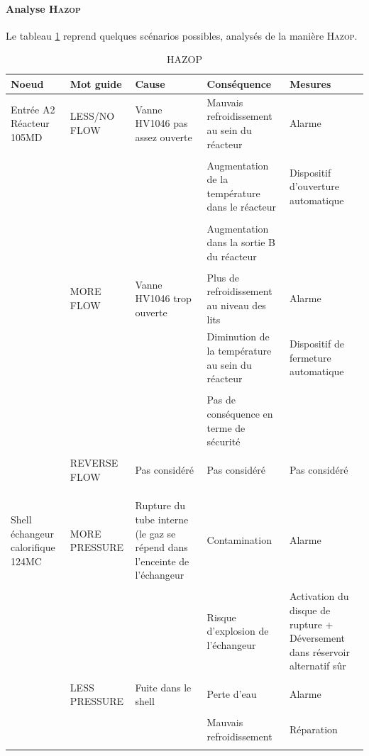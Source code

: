 \documentclass{article}
\begin{document}
\paragraph{Analyse \textsc{Hazop}} Le tableau \ref{Hazop} reprend quelques scénarios possibles, analysés de la manière \textsc{Hazop}.
\begin{landscape}
\begin{table}
\centering
\begin{tabular}{|p{2cm}|p{3cm}|p{4cm}|p{6cm}|p{5cm}|}
\hline
Noeud & Mot guide & Cause & Conséquence & Mesures \\
\hline
\hline
Entrée A2 Réacteur 105MD & LESS/NO FLOW & Vanne HV1046 pas assez ouverte & Mauvais refroidissement au sein du
réacteur & Alarme \\
& & & & \\
& & & Augmentation de la température dans le réacteur & Dispositif d'ouverture automatique \\
& & & & \\
& & & Augmentation dans la sortie B du réacteur & \\
& & & & \\
& MORE FLOW & Vanne HV1046 trop ouverte & Plus de refroidissement au niveau des lits & Alarme \\
& & & Diminution de la température au sein du réacteur & Dispositif de fermeture automatique \\
& & & & \\
& & & Pas de conséquence en terme de sécurité & \\
& & & & \\
& REVERSE FLOW & Pas considéré & Pas considéré & Pas considéré \\
& & & & \\
& & & & \\
& & & & \\
Shell échangeur calorifique 124MC & MORE PRESSURE & Rupture du tube interne (le gaz se répend dans l'enceinte de
l'échangeur & Contamination & Alarme \\
& & & & \\
& & & Risque d'explosion de l'échangeur & Activation du disque de rupture + Déversement dans réservoir alternatif sûr \\
& & & & \\
& LESS PRESSURE & Fuite dans le shell & Perte d'eau & Alarme \\
& & & & \\
& & & Mauvais refroidissement & Réparation \\
& & & & \\
\hline
\end{tabular}
\caption{HAZOP}
\label{Hazop}
\end{table}
\end{landscape}
\end{document}
